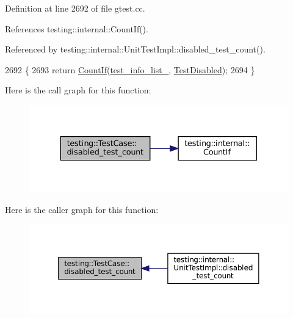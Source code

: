 Definition at line 2692 of file gtest.\+cc.



References testing\+::internal\+::\+Count\+If().



Referenced by testing\+::internal\+::\+Unit\+Test\+Impl\+::disabled\+\_\+test\+\_\+count().


\begin{DoxyCode}
2692                                         \{
2693   \textcolor{keywordflow}{return} \hyperlink{namespacetesting_1_1internal_a1e77a774d910346eff11a86d8df783a5}{CountIf}(\hyperlink{classtesting_1_1TestCase_adce272a48399dd67a7bdd14fa7e99b80}{test\_info\_list\_}, \hyperlink{classtesting_1_1TestCase_a2c6989cdeac01b2153f2e34dca1dbde6}{TestDisabled});
2694 \}
\end{DoxyCode}
Here is the call graph for this function\+:
\nopagebreak
\begin{figure}[H]
\begin{center}
\leavevmode
\includegraphics[width=330pt]{classtesting_1_1TestCase_a8ef690ab8ec74d02c99416637de71ae8_cgraph}
\end{center}
\end{figure}
Here is the caller graph for this function\+:
\nopagebreak
\begin{figure}[H]
\begin{center}
\leavevmode
\includegraphics[width=350pt]{classtesting_1_1TestCase_a8ef690ab8ec74d02c99416637de71ae8_icgraph}
\end{center}
\end{figure}
\mbox{\label{classtesting_1_1TestCase_acd7d6a77bce06da6ef90f5dad1c4def1}} 
